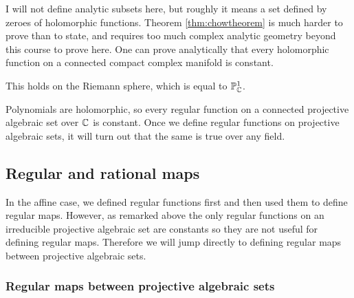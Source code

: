 I will not define analytic subsets here, but roughly it means a set defined by zeroes of holomorphic functions. Theorem \ref{thm:chowtheorem} is much harder to prove than to state, and requires too much complex analytic geometry beyond this course to prove here. One can prove analytically that every holomorphic function on a connected compact complex manifold is constant.

\begin{example*}
This holds on the Riemann sphere, which is equal to $ \mathbb{P}_{\mathbb{C}}^1 $.
\end{example*}

Polynomials are holomorphic, so every regular function on a connected projective algebraic set over $ \mathbb{C} $ is constant. Once we define regular functions on projective algebraic sets, it will turn out that the same is true over any field.

\pagebreak

\subsection{Regular and rational maps}

In the affine case, we defined regular functions first and then used them to define regular maps. However, as remarked above the only regular functions on an irreducible projective algebraic set are constants so they are not useful for defining regular maps. Therefore we will jump directly to defining regular maps between projective algebraic sets.

\subsubsection{Regular maps between projective algebraic sets}

